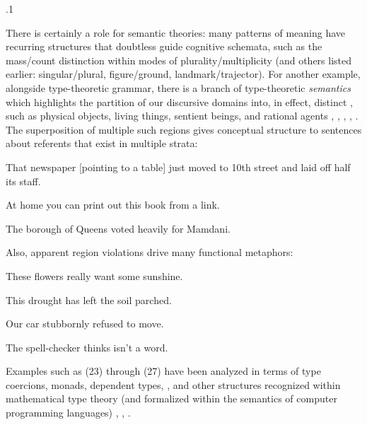 \documentclass[11pt, twocolumn]{article}
\begin{document}
\p.1{%
\:\+There is certainly a role for semantic theories:
many patterns of meaning have recurring structures
that doubtless guide cognitive schemata,
such as the mass/count distinction within modes
of plurality/multiplicity (and others listed earlier:
singular/plural, figure/ground, 
landmark/\allowbreak{}trajector). \> For 
another example, alongside type-theoretic
grammar, there is a branch of type-theoretic
\textit{semantics} which highlights the partition
of our discursive domains into, in effect,
distinct , such as
physical objects, living things, sentient
beings, and rational agents , ,
, ,
. \> The superposition of
multiple such regions gives conceptual structure
to sentences about referents that exist in multiple strata:\<

\begin{exsGroup}

\exsItem{}   That newspaper [pointing to a table] just moved to 10th street
and laid off half its staff.

\exsItem{}   At home you can print out this book from a  link.

\exsItem{}   The borough of Queens voted heavily for Mamdani.\vspace{2pt}

\end{exsGroup}

\nip{}%
\+Also, apparent region violations drive many functional metaphors:\<

\begin{exsGroup}

\exsItem{}   These flowers really want some sunshine.

\exsItem{}   This drought has left the soil parched.

\exsItem{}   Our car stubbornly refused to move.

\exsItem{}   The spell-checker thinks  isn't a word.\vspace{2pt}

\end{exsGroup}

\nip{}%
\+Examples such as \exsRef(23) through \exsRef(27) have been analyzed in terms of
type coercions, monads, dependent types, , and
other structures recognized within mathematical type theory (and
formalized within the semantics of computer programming languages)
, , .\<\;
} %
\end{document}
